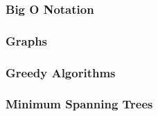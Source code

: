 \documentclass{article}
\author{Ian Chen}
\date{\today}
\begin{document}
    \subsubsection*{Big O Notation}
    \subsubsection*{Graphs}
    \subsubsection*{Greedy Algorithms}
    \subsubsection*{Minimum Spanning Trees}
\end{document}
